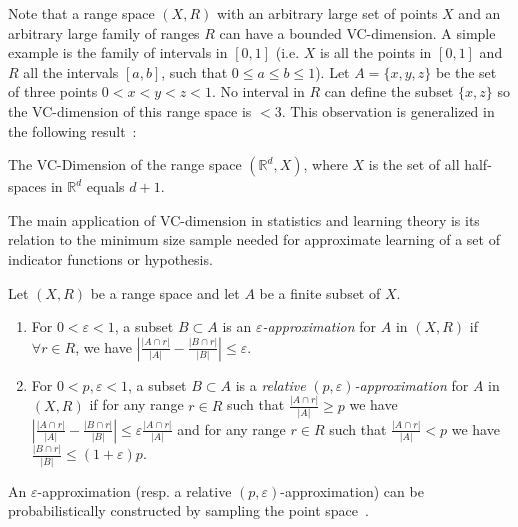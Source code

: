 Note that a range space $(X,R)$ with an arbitrary large set of points $X$ and
an arbitrary large family of ranges $R$ can have a bounded VC-dimension. A simple
example is the family of intervals in $[0,1]$ (i.e. $X$ is all the points in
$[0,1]$ and $R$ all the intervals $[a,b]$, such that $0\leq a\leq b\leq 1$). Let
$A=\{x,y,z\}$ be the set of three points $0<x<y<z<1$. No interval in $R$ can
define the subset $\{x,z\}$ so the VC-dimension of this range space is $< 3$.
This observation is generalized in the following result~\citep[Lemma
10.3.1]{Matousek02}:

\begin{lemma}\label{lem:matousek}
  The VC-Dimension of the range space $(\mathbb{R}^d, X)$, where $X$ is the set
  of all half-spaces in $\mathbb{R}^d$ equals $d+1$.
\end{lemma}

The main application of VC-dimension in statistics and learning theory is its
relation to the minimum size sample needed for approximate learning of a
set of indicator functions or hypothesis. 

\begin{definition}\label{definition:eapprox}
  Let $(X,R)$ be a range space and let $A$ be a finite subset of $X$. 
  \begin{enumerate}
  \item 
  For
  $0<\varepsilon<1$, a subset $B\subset A$ is an
  $\varepsilon${\em-approximation}
  for $A$ in $(X,R)$  if $\forall r\in R$, we have  $\left|\frac{|A\cap
  r|}{|A|}-\frac{|B\cap r|}{|B|}\right| \leq \varepsilon$.
   \item For
  $0<p,\varepsilon<1$, a subset $B\subset A$ is a \emph{relative}
  $(p,\varepsilon)$\emph{-approximation}
  for $A$ in $(X,R)$ if for any range $r\in R$ such that 
  $\frac{|A\cap r|}{|A|}\geq p$ we have $\left|\frac{|A\cap r|}{|A|}-\frac{|B\cap
  r|}{|B|}\right| \leq \varepsilon\frac{|A\cap r|}{|A|}$ and for any range $r\in R$ such that 
  $\frac{|A\cap r|}{|A|}< p$ we have $\frac{|B\cap r|}{|B|} \leq (1+\varepsilon)p$.
\end{enumerate}
\end{definition}


An $\varepsilon$-approximation (resp.
a relative $(p,\varepsilon)$-approximation) can be probabilistically constructed by sampling the point
space~\citep{VapnikC71,LiLS01,HarPS11}.

